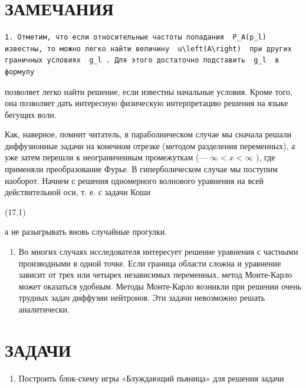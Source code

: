 \documentclass[
  ukrainian,
]{article}
\providecommand{\tightlist}{%
  \setlength{\itemsep}{0pt}\setlength{\parskip}{0pt}}
\begin{document}
\section{ЗАМЕЧАНИЯ}\label{ux437ux430ux43cux435ux447ux430ux43dux438ux44f-2}

\begin{verbatim}
1. Отметим, что если относительные частоты попадания  P_A(p_l)  известны, то можно легко найти величину  u\left(A\right)  при других граничных условиях  g_l . Для этого достаточно подставить  g_l  в формулу
\end{verbatim}

позволяет легко найти решение, если известны начальные условия. Кроме
того, она позволяет дать интересную физическую интерпретацию решения на
языке бегущих волн.

Как, наверное, помнит читатель, в параболническом случае мы сначала
решали диффузионные задачи на конечном отрезке (методом разделения
переменных), а уже затем перешли к неограниченным промежуткам (---
\(\infty < x < \infty\) ), где применяли преобразование Фурье. В
гиперболическом случае мы поступим наоборот. Начнем с решения
одномерного волнового уравнения на всей действительной оси, т. е. с
задачи Коши

(17.1)

а не разыгрывать вновь случайные прогулки.

\begin{enumerate}
\def\labelenumi{\arabic{enumi}.}
\setcounter{enumi}{1}
\tightlist
\item
  Во многих случаях исследователя интересует решение уравнения с
  частными производными в одной точке. Если граница области сложна и
  уравнение зависит от трех или четырех независимых переменных, метод
  Монте-Карло может оказаться удобным. Методы Монте-Карло возникли при
  решении очень трудных задач диффузии нейтронов. Эти задачи невозможно
  решать аналитически.
\end{enumerate}

\section{ЗАДАЧИ}\label{ux437ux430ux434ux430ux447ux438-3}

\begin{enumerate}
\def\labelenumi{\arabic{enumi}.}
\tightlist
\item
  Построить блок-схему игры «Блуждающий пьяница» для решения задачи
\end{enumerate}
\end{document}
